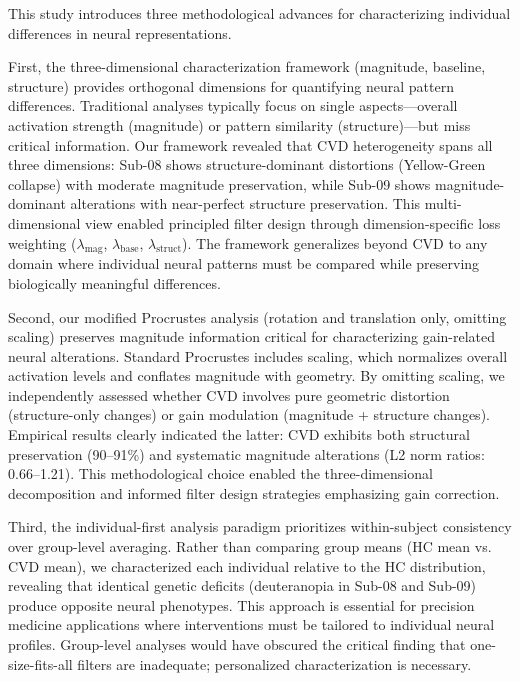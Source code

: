 \documentclass[12pt,a4paper]{article}
\begin{document}
This study introduces three methodological advances for characterizing individual differences in neural representations.

First, the three-dimensional characterization framework (magnitude, baseline, structure) provides orthogonal dimensions for quantifying neural pattern differences. Traditional analyses typically focus on single aspects---overall activation strength (magnitude) or pattern similarity (structure)---but miss critical information. Our framework revealed that CVD heterogeneity spans all three dimensions: Sub-08 shows structure-dominant distortions (Yellow-Green collapse) with moderate magnitude preservation, while Sub-09 shows magnitude-dominant alterations with near-perfect structure preservation. This multi-dimensional view enabled principled filter design through dimension-specific loss weighting ($\lambda_{\text{mag}}$, $\lambda_{\text{base}}$, $\lambda_{\text{struct}}$). The framework generalizes beyond CVD to any domain where individual neural patterns must be compared while preserving biologically meaningful differences.

Second, our modified Procrustes analysis (rotation and translation only, omitting scaling) preserves magnitude information critical for characterizing gain-related neural alterations. Standard Procrustes includes scaling, which normalizes overall activation levels and conflates magnitude with geometry. By omitting scaling, we independently assessed whether CVD involves pure geometric distortion (structure-only changes) or gain modulation (magnitude + structure changes). Empirical results clearly indicated the latter: CVD exhibits both structural preservation (90--91\%) and systematic magnitude alterations (L2 norm ratios: 0.66--1.21). This methodological choice enabled the three-dimensional decomposition and informed filter design strategies emphasizing gain correction.

Third, the individual-first analysis paradigm prioritizes within-subject consistency over group-level averaging. Rather than comparing group means (HC mean vs. CVD mean), we characterized each individual relative to the HC distribution, revealing that identical genetic deficits (deuteranopia in Sub-08 and Sub-09) produce opposite neural phenotypes. This approach is essential for precision medicine applications where interventions must be tailored to individual neural profiles. Group-level analyses would have obscured the critical finding that one-size-fits-all filters are inadequate; personalized characterization is necessary.
\end{document}
